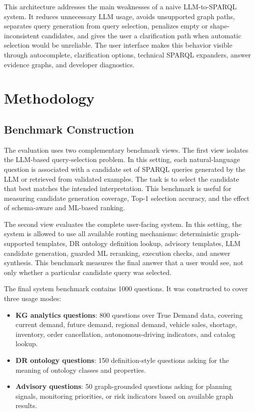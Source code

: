 \documentclass[
  12pt,
  english,
  oneside]{report}
\begin{document}
This architecture addresses the main weaknesses of a naive LLM-to-SPARQL system. It reduces unnecessary LLM usage, avoids unsupported graph paths, separates query generation from query selection, penalizes empty or shape-inconsistent candidates, and gives the user a clarification path when automatic selection would be unreliable. The user interface makes this behavior visible through autocomplete, clarification options, technical SPARQL expanders, answer evidence graphs, and developer diagnostics.





\chapter{Methodology}
\label{chap:methodology}

\section{Benchmark Construction}
\label{sec:benchmark-construction}

The evaluation uses two complementary benchmark views. The first view isolates the LLM-based query-selection problem. In this setting, each natural-language question is associated with a candidate set of SPARQL queries generated by the LLM or retrieved from validated examples. The task is to select the candidate that best matches the intended interpretation. This benchmark is useful for measuring candidate generation coverage, Top-1 selection accuracy, and the effect of schema-aware and ML-based ranking.

The second view evaluates the complete user-facing system. In this setting, the system is allowed to use all available routing mechanisms: deterministic graph-supported templates, DR ontology definition lookup, advisory templates, LLM candidate generation, guarded ML reranking, execution checks, and answer synthesis. This benchmark measures the final answer that a user would see, not only whether a particular candidate query was selected.

The final system benchmark contains 1000 questions. It was constructed to cover three usage modes:

\begin{itemize}
    \item \textbf{KG analytics questions}: 800 questions over True Demand data, covering current demand, future demand, regional demand, vehicle sales, shortage, inventory, order cancellation, autonomous-driving indicators, and catalog lookup.
    \item \textbf{DR ontology questions}: 150 definition-style questions asking for the meaning of ontology classes and properties.
    \item \textbf{Advisory questions}: 50 graph-grounded questions asking for planning signals, monitoring priorities, or risk indicators based on available graph results.
\end{itemize}
\end{document}
